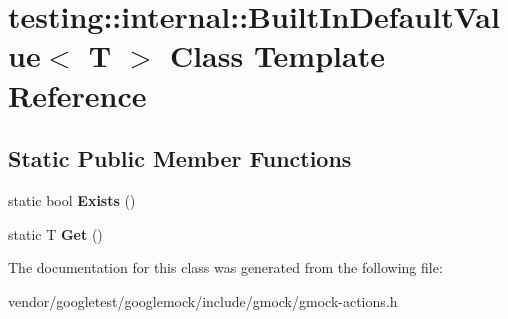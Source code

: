 \hypertarget{classtesting_1_1internal_1_1BuiltInDefaultValue}{}\section{testing\+:\+:internal\+:\+:Built\+In\+Default\+Value$<$ T $>$ Class Template Reference}
\label{classtesting_1_1internal_1_1BuiltInDefaultValue}
\subsection*{Static Public Member Functions}
\begin{DoxyCompactItemize}
\item 
static bool {\bfseries Exists} ()\hypertarget{classtesting_1_1internal_1_1BuiltInDefaultValue_a35207bc20a493b0efb3980eb9a08dd2f}{}\label{classtesting_1_1internal_1_1BuiltInDefaultValue_a35207bc20a493b0efb3980eb9a08dd2f}

\item 
static T {\bfseries Get} ()\hypertarget{classtesting_1_1internal_1_1BuiltInDefaultValue_a7e26c1df14a887c8f393b29d6ea162e6}{}\label{classtesting_1_1internal_1_1BuiltInDefaultValue_a7e26c1df14a887c8f393b29d6ea162e6}

\end{DoxyCompactItemize}


The documentation for this class was generated from the following file\+:\begin{DoxyCompactItemize}
\item 
vendor/googletest/googlemock/include/gmock/gmock-\/actions.\+h\end{DoxyCompactItemize}
